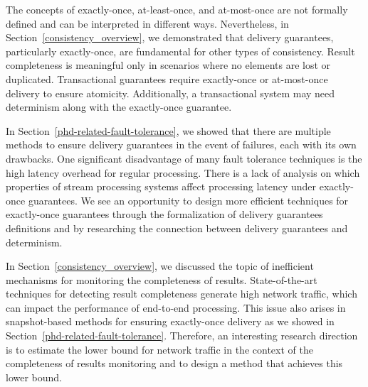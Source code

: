 \label{phd_discussion}

The concepts of exactly-once, at-least-once, and at-most-once are not formally defined and can be interpreted in different ways. Nevertheless, in Section~\ref{consistency_overview}, we demonstrated that delivery guarantees, particularly exactly-once, are fundamental for other types of consistency. Result completeness is meaningful only in scenarios where no elements are lost or duplicated. Transactional guarantees require exactly-once or at-most-once delivery to ensure atomicity. Additionally, a transactional system may need determinism along with the exactly-once guarantee.

In Section~\ref{phd-related-fault-tolerance}, we showed that there are multiple methods to ensure delivery guarantees in the event of failures, each with its own drawbacks. One significant disadvantage of many fault tolerance techniques is the high latency overhead for regular processing. There is a lack of analysis on which properties of stream processing systems affect processing latency under exactly-once guarantees. We see an opportunity to design more efficient techniques for exactly-once guarantees through the formalization of delivery guarantees definitions and by researching the connection between delivery guarantees and determinism.

In Section~\ref{consistency_overview}, we discussed the topic of inefficient mechanisms for monitoring the completeness of results. State-of-the-art techniques for detecting result completeness generate high network traffic, which can impact the performance of end-to-end processing. This issue also arises in snapshot-based methods for ensuring exactly-once delivery as we showed in Section~\ref{phd-related-fault-tolerance}. Therefore, an interesting research direction is to estimate the lower bound for network traffic in the context of the completeness of results monitoring and to design a method that achieves this lower bound.
